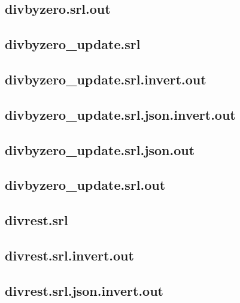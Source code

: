 \subsection{divbyzero.srl.out}
\label{app:divbyzero_srl.out}

\subsection{divbyzero\_update.srl}
\label{app:divbyzero_update_srl}

\subsection{divbyzero\_update.srl.invert.out}
\label{app:divbyzero_update_srl.invert.out}

\subsection{divbyzero\_update.srl.json.invert.out}
\label{app:divbyzero_update_srl.json.invert.out}

\subsection{divbyzero\_update.srl.json.out}
\label{app:divbyzero_update_srl.json.out}

\subsection{divbyzero\_update.srl.out}
\label{app:divbyzero_update_srl.out}

\subsection{divrest.srl}
\label{app:divrest_srl}

\subsection{divrest.srl.invert.out}
\label{app:divrest_srl.invert.out}

\subsection{divrest.srl.json.invert.out}
\label{app:divrest_srl.json.invert.out}

